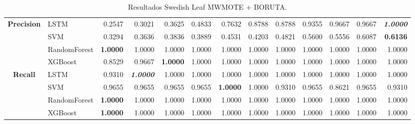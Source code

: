 \begin{table}[H]
\begin{adjustbox}{max width=14cm}
\begin{tabular}{|c|l|r|r|r|r|r|r|r|r|r|r|r|}
		\hline
		\textbf{Precision} &  LSTM &  0.2547 &  0.3021 &  0.3625 &  0.4833 &  0.7632 &  0.8788 &  0.8788 &  0.9355 &  0.9667 &  0.9667 & \textit{ \textbf{  1.0000 } } \\
		&  SVM &  0.3294 &  0.3636 &  0.3836 &  0.3889 &  0.4531 &  0.4203 &  0.4821 &  0.5600 &  0.5556 &  0.6087 & \textbf{  0.6136 } \\
		&  RandomForest & \textbf{  1.0000 } &  1.0000 &  1.0000 &  1.0000 &  1.0000 &  1.0000 &  1.0000 &  1.0000 &  1.0000 &  1.0000 &  1.0000 \\
		&  XGBoost &  0.8529 &  0.9667 & \textbf{  1.0000 } &  1.0000 &  1.0000 &  1.0000 &  1.0000 &  1.0000 &  1.0000 &  1.0000 &  1.0000 \\
		\hline
		\textbf{Recall} &  LSTM &  0.9310 & \textit{ \textbf{  1.0000 } } &  1.0000 &  1.0000 &  1.0000 &  1.0000 &  1.0000 &  1.0000 &  1.0000 &  1.0000 &  1.0000 \\
		&  SVM &  0.9655 &  0.9655 &  0.9655 &  0.9655 & \textbf{  1.0000 } &  1.0000 &  0.9310 &  0.9655 &  0.8621 &  0.9655 &  0.9310 \\
		&  RandomForest & \textbf{  1.0000 } &  1.0000 &  1.0000 &  1.0000 &  1.0000 &  1.0000 &  1.0000 &  1.0000 &  1.0000 &  1.0000 &  1.0000 \\
		&  XGBoost & \textbf{  1.0000 } &  1.0000 &  1.0000 &  1.0000 &  1.0000 &  1.0000 &  1.0000 &  1.0000 &  1.0000 &  1.0000 &  1.0000 \\
		\hline
	\end{tabular}
\end{adjustbox}
\caption{Resultados Swedish Leaf MWMOTE + BORUTA.}
\label{tab:SLeaf_MWMOTE_BORUTA}
\end{table}


